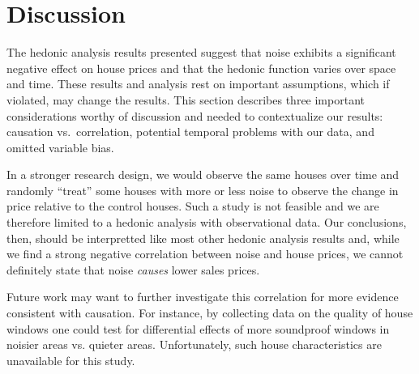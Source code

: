 \documentclass{article}\usepackage{graphicx, color}
\begin{document}
\section{Discussion}\label{Discussion}

The hedonic analysis results presented suggest that noise exhibits a significant negative effect on house prices and that the hedonic function varies over space and time. These results and analysis rest on important assumptions, which if violated, may change the results. This section describes three important considerations worthy of discussion and needed to contextualize our results: causation vs.\ correlation, potential temporal problems with our data, and omitted variable bias.

In a stronger research design, we would observe the same houses over time and randomly ``treat'' some houses with more or less noise to observe the change in price relative to the control houses. Such a study is not feasible and we are therefore limited to a hedonic analysis with observational data. Our conclusions, then, should be interpretted like most other hedonic analysis results and, while we find a strong negative correlation between noise and house prices, we cannot definitely state that noise \emph{causes} lower sales prices. 

Future work may want to further investigate this correlation for more evidence consistent with causation. For instance, by collecting data on the quality of house windows one could test for differential effects of more soundproof windows in noisier areas vs. quieter areas. Unfortunately, such house characteristics are unavailable for this study. 
\end{document}
